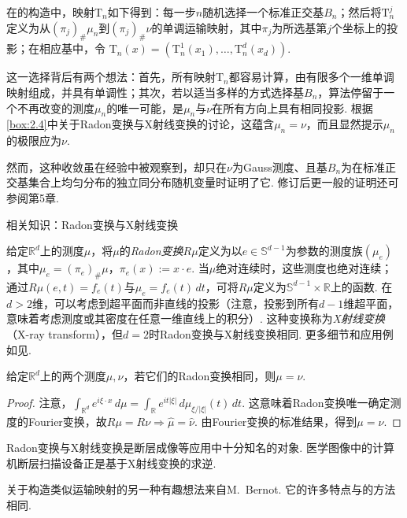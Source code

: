 在\cite{b252}的构造中，映射$\mathrm T_n$如下得到：每一步$n$随机选择一个标准正交基$B_n$；然后将$\mathrm T_n^j$定义为从$(\pi_j)_\#\mu_n$到$(\pi_j)_\#\nu$的单调运输映射，其中$\pi_j$为所选基第$j$个坐标上的投影；在相应基中，令
$\mathrm T_n(x)=(\mathrm T_n^1(x_1),\ldots,\mathrm T_n^d(x_d))$.

这一选择背后有两个想法：首先，所有映射$\mathrm T_n$都容易计算，由有限多个一维单调映射组成，并具有单调性；其次，若以适当多样的方式选择基$B_n$，算法停留于一个不再改变的测度$\mu_n$的唯一可能，是$\mu_n$与$\nu$在所有方向上具有相同投影. 根据\autoref{box:2.4}中关于Radon变换与X射线变换的讨论，这蕴含$\mu_n=\nu$，而且显然提示$\mu_n$的极限应为$\nu$.

然而，这种收敛虽在经验中被观察到，\cite{b252}却只在$\nu$为Gauss测度、且基$B_n$为在标准正交基集合上均匀分布的独立同分布随机变量时证明了它. 修订后更一般的证明还可参阅\cite{b65}第5章.

\begin{sourcebox}{相关知识：Radon变换与X射线变换}\label{box:2.4}
\begin{definition*}
给定$\mathbb R^d$上的测度$\mu$，将$\mu$的\emph{Radon变换}$R\mu$定义为以$e\in\mathbb S^{d-1}$为参数的测度族$(\mu_e)$，其中$\mu_e=(\pi_e)_\#\mu$，$\pi_e(x):=x\cdot e$. 当$\mu$绝对连续时，这些测度也绝对连续；通过$R\mu(e,t)=f_e(t)$与$\mu_e=f_e(t)\,dt$，可将$R\mu$定义为$\mathbb S^{d-1}\times\mathbb R$上的函数. 在$d>2$维，可以考虑到超平面而非直线的投影（注意，投影到所有$d-1$维超平面，意味着考虑测度或其密度在任意一维直线上的积分）. 这种变换称为\emph{X射线变换}（X-ray transform），但$d=2$时Radon变换与X射线变换相同. 更多细节和应用例如见\cite{b192}.
\end{definition*}

\begin{proposition*}
给定$\mathbb R^d$上的两个测度$\mu,\nu$，若它们的Radon变换相同，则$\mu=\nu$.
\end{proposition*}
\begin{proof}
注意，$\int_{\mathbb R^d}e^{i\xi\cdot x}\,d\mu=\int_{\mathbb R}e^{it|\xi|}\,d\mu_{\xi/|\xi|}(t)\,dt$. 这意味着Radon变换唯一确定测度的Fourier变换，故$R\mu=R\nu\Rightarrow\widehat\mu=\widehat\nu$. 由Fourier变换的标准结果，得到$\mu=\nu$.
\end{proof}

Radon变换与X射线变换是断层成像等应用中十分知名的对象. 医学图像中的计算机断层扫描设备正是基于X射线变换的求逆.
\end{sourcebox}

\label{idx:i140-p82}
关于构造类似运输映射的另一种有趣想法来自M.~Bernot. 它的许多特点与\cite{b252}的方法相同.

